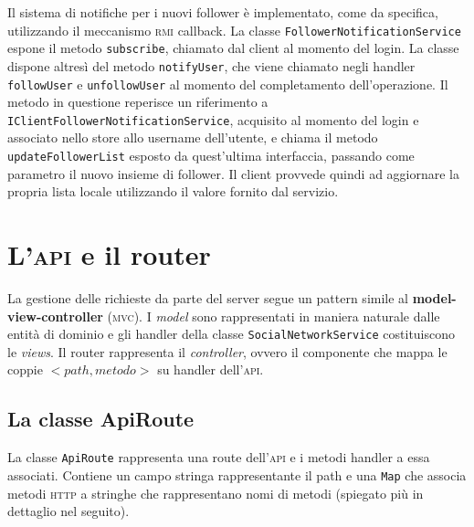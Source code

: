 \documentclass[a4paper,8pt]{article} %
\def\code#1{\texttt{#1}}
\begin{document}
\par Il sistema di notifiche per i nuovi follower è implementato, come da specifica, utilizzando il meccanismo \textsc{rmi} callback. La classe \code{FollowerNotificationService} espone il metodo \code{subscribe}, chiamato dal client al momento del login.
La classe dispone altresì del metodo \code{notifyUser}, che viene chiamato negli handler \code{followUser} e \code{unfollowUser} al momento del completamento dell'operazione. Il metodo in questione reperisce un riferimento a \code{IClientFollowerNotificationService},
acquisito al momento del login e associato nello store allo username dell'utente, e chiama il metodo \code{updateFollowerList} esposto da quest'ultima interfaccia, passando come parametro il nuovo insieme di follower.
Il client provvede quindi ad aggiornare la propria lista locale utilizzando il valore fornito dal servizio.



\section{L'\textsc{api} e il router}
La gestione delle richieste da parte del server segue un pattern simile al \textbf{model-view-controller} (\textsc{mvc}).
I \emph{model} sono rappresentati in maniera naturale dalle entità di dominio e gli handler della classe \code{SocialNetworkService} costituiscono
le \emph{views}. Il router rappresenta il \emph{controller}, ovvero il componente che mappa le coppie $<path, metodo>$ su handler dell'\textsc{api}.

\subsection{La classe ApiRoute}
La classe \code{ApiRoute} rappresenta una route dell'\textsc{api} e i metodi handler a essa associati. Contiene un campo stringa rappresentante il path e una \code{Map}
che associa metodi \textsc{http} a stringhe che rappresentano nomi di metodi (spiegato più in dettaglio nel seguito).
\end{document}

